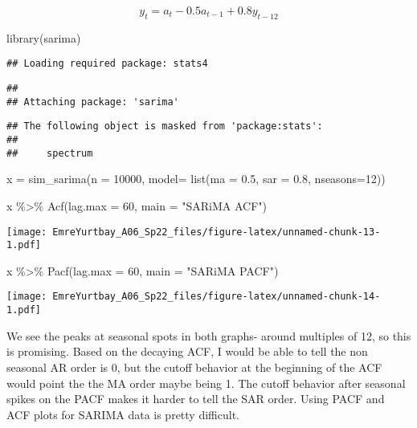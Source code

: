 \documentclass[
]{article}
\newenvironment{Shaded}{\begin{snugshade}}{\end{snugshade}}
\newcommand{\AttributeTok}[1]{\textcolor[rgb]{0.77,0.63,0.00}{#1}}
\newcommand{\DecValTok}[1]{\textcolor[rgb]{0.00,0.00,0.81}{#1}}
\newcommand{\FloatTok}[1]{\textcolor[rgb]{0.00,0.00,0.81}{#1}}
\newcommand{\FunctionTok}[1]{\textcolor[rgb]{0.00,0.00,0.00}{#1}}
\newcommand{\NormalTok}[1]{#1}
\newcommand{\OtherTok}[1]{\textcolor[rgb]{0.56,0.35,0.01}{#1}}
\newcommand{\SpecialCharTok}[1]{\textcolor[rgb]{0.00,0.00,0.00}{#1}}
\newcommand{\StringTok}[1]{\textcolor[rgb]{0.31,0.60,0.02}{#1}}
\begin{document}
\[
y_t = a_t - 0.5a_{t-1} + 0.8y_{t -12}
\]

\begin{Shaded}
\begin{Highlighting}[]
\FunctionTok{library}\NormalTok{(sarima)}
\end{Highlighting}
\end{Shaded}

\begin{verbatim}
## Loading required package: stats4
\end{verbatim}

\begin{verbatim}
## 
## Attaching package: 'sarima'
\end{verbatim}

\begin{verbatim}
## The following object is masked from 'package:stats':
## 
##     spectrum
\end{verbatim}

\begin{Shaded}
\begin{Highlighting}[]
\NormalTok{x }\OtherTok{=} \FunctionTok{sim\_sarima}\NormalTok{(}\AttributeTok{n =} \DecValTok{10000}\NormalTok{, }\AttributeTok{model=} \FunctionTok{list}\NormalTok{(}\AttributeTok{ma =} \FloatTok{0.5}\NormalTok{, }\AttributeTok{sar =} \FloatTok{0.8}\NormalTok{, }\AttributeTok{nseasons=}\DecValTok{12}\NormalTok{))}
\end{Highlighting}
\end{Shaded}

\begin{Shaded}
\begin{Highlighting}[]
\NormalTok{x }\SpecialCharTok{\%\textgreater{}\%} 
  \FunctionTok{Acf}\NormalTok{(}\AttributeTok{lag.max =} \DecValTok{60}\NormalTok{,}
      \AttributeTok{main =} \StringTok{"SARiMA ACF"}\NormalTok{)}
\end{Highlighting}
\end{Shaded}

\texttt{[image: EmreYurtbay\_A06\_Sp22\_files/figure-latex/unnamed-chunk-13-1.pdf]}

\begin{Shaded}
\begin{Highlighting}[]
\NormalTok{x }\SpecialCharTok{\%\textgreater{}\%} 
  \FunctionTok{Pacf}\NormalTok{(}\AttributeTok{lag.max =} \DecValTok{60}\NormalTok{,}
      \AttributeTok{main =} \StringTok{"SARiMA PACF"}\NormalTok{)}
\end{Highlighting}
\end{Shaded}

\texttt{[image: EmreYurtbay\_A06\_Sp22\_files/figure-latex/unnamed-chunk-14-1.pdf]}

We see the peaks at seasonal spots in both graphs- around multiples of
12, so this is promising. Based on the decaying ACF, I would be able to
tell the non seasonal AR order is 0, but the cutoff behavior at the
beginning of the ACF would point the the MA order maybe being 1. The
cutoff behavior after seasonal spikes on the PACF makes it harder to
tell the SAR order. Using PACF and ACF plots for SARIMA data is pretty
difficult.
\end{document}
